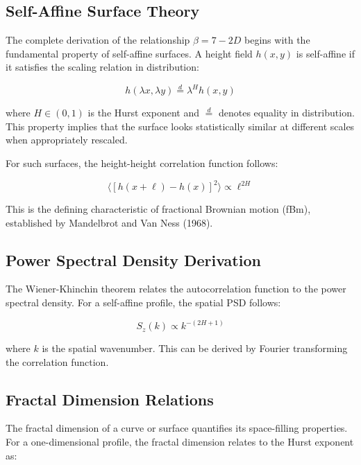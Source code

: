 \documentclass[11pt]{article}
\begin{document}
\subsection{Self-Affine Surface Theory}

The complete derivation of the relationship $\beta = 7-2D$ begins with the fundamental property of self-affine surfaces. A height field $h(x,y)$ is self-affine if it satisfies the scaling relation in distribution:

\begin{equation}
h(\lambda x, \lambda y) \stackrel{d}{=} \lambda^H h(x,y)
\end{equation}

where $H \in (0,1)$ is the Hurst exponent and $\stackrel{d}{=}$ denotes equality in distribution. This property implies that the surface looks statistically similar at different scales when appropriately rescaled.

For such surfaces, the height-height correlation function follows:

\begin{equation}
\langle [h(x+\ell) - h(x)]^2 \rangle \propto \ell^{2H}
\end{equation}

This is the defining characteristic of fractional Brownian motion (fBm), established by Mandelbrot and Van Ness (1968).

\subsection{Power Spectral Density Derivation}

The Wiener-Khinchin theorem relates the autocorrelation function to the power spectral density. For a self-affine profile, the spatial PSD follows:

\begin{equation}
S_z(k) \propto k^{-(2H+1)}
\end{equation}

where $k$ is the spatial wavenumber. This can be derived by Fourier transforming the correlation function.


\subsection{Fractal Dimension Relations}

The fractal dimension of a curve or surface quantifies its space-filling properties. For a one-dimensional profile, the fractal dimension relates to the Hurst exponent as:
\end{document}
